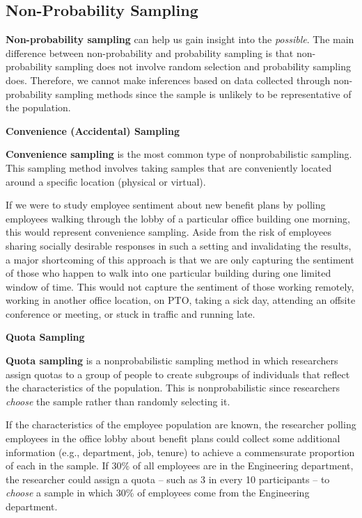 \documentclass[
]{book}
\begin{document}
\hypertarget{non-probability-sampling}{%
\subsection{Non-Probability Sampling}\label{non-probability-sampling}}

\textbf{Non-probability sampling} can help us gain insight into the \emph{possible}. The main difference between non-probability and probability sampling is that non-probability sampling does not involve random selection and probability sampling does. Therefore, we cannot make inferences based on data collected through non-probability sampling methods since the sample is unlikely to be representative of the population.

\textbf{Convenience (Accidental) Sampling}

\textbf{Convenience sampling} is the most common type of nonprobabilistic sampling. This sampling method involves taking samples that are conveniently located around a specific location (physical or virtual).

If we were to study employee sentiment about new benefit plans by polling employees walking through the lobby of a particular office building one morning, this would represent convenience sampling. Aside from the risk of employees sharing socially desirable responses in such a setting and invalidating the results, a major shortcoming of this approach is that we are only capturing the sentiment of those who happen to walk into one particular building during one limited window of time. This would not capture the sentiment of those working remotely, working in another office location, on PTO, taking a sick day, attending an offsite conference or meeting, or stuck in traffic and running late.

\textbf{Quota Sampling}

\textbf{Quota sampling} is a nonprobabilistic sampling method in which researchers assign quotas to a group of people to create subgroups of individuals that reflect the characteristics of the population. This is nonprobabilistic since researchers \emph{choose} the sample rather than randomly selecting it.

If the characteristics of the employee population are known, the researcher polling employees in the office lobby about benefit plans could collect some additional information (e.g., department, job, tenure) to achieve a commensurate proportion of each in the sample. If 30\% of all employees are in the Engineering department, the researcher could assign a quota -- such as 3 in every 10 participants -- to \emph{choose} a sample in which 30\% of employees come from the Engineering department.
\end{document}
